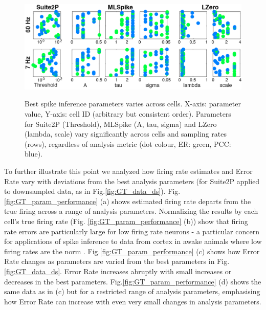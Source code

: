 \documentclass[a4paper,10pt,twocolumn]{article}
\begin{document}
\begin{figure}[h!]
{\includegraphics[width=\textwidth]{full_figs/why_deconvolve_F1_3.png}}
{\caption{Best spike inference parameters varies across cells. X-axis: parameter value, Y-axis: cell ID (arbitrary but consistent order). Parameters for Suite2P (Threshold), MLSpike (A, tau, sigma) and LZero (lambda, scale) vary significantly across cells and sampling rates (rows), regardless of analysis metric (dot colour, ER: green, PCC: blue).
\label{fig:GT_data_params}}}
\end{figure}

To further illustrate this point we analyzed how firing rate estimates and Error Rate vary with deviations from the best analysis parameters (for Suite2P applied to downsampled data, as in Fig.\ref{fig:GT_data_ds}).  Fig. \ref{fig:GT_param_performance} (a) shows estimated firing rate departs from the true firing across a range of analysis parameters. Normalizing the results by each cell's true firing rate (Fig. \ref{fig:GT_param_performance} (b)) show that firing rate errors are particularly large for low firing rate neurons - a particular concern for applications of spike inference to data from cortex in awake animals where low firing rates are the norm \citep{OConnor2010-hd,Wohrer2013-rp}. Fig.\ref{fig:GT_param_performance} (c) shows how Error Rate changes as parameters are varied from the best parameters in Fig.\ref{fig:GT_data_ds}. Error Rate increases abruptly with small increases or decreases in the best parameters. Fig.\ref{fig:GT_param_performance} (d) shows the same data as in (c) but for a restricted range of analysis parameters, emphasising how Error Rate can increase with even very small changes in analysis parameters.
\end{document}
